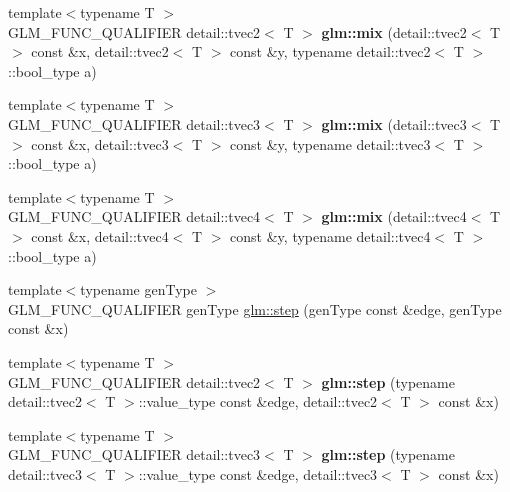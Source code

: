 \begin{DoxyCompactItemize}
\item 
\hypertarget{namespaceglm_a05ad08dcf9406a0f4fc653e91052cc7d}{}{\footnotesize template$<$typename T $>$ }\\G\+L\+M\+\_\+\+F\+U\+N\+C\+\_\+\+Q\+U\+A\+L\+I\+F\+I\+E\+R detail\+::tvec2$<$ T $>$ {\bfseries glm\+::mix} (detail\+::tvec2$<$ T $>$ const \&x, detail\+::tvec2$<$ T $>$ const \&y, typename detail\+::tvec2$<$ T $>$\+::bool\+\_\+type a)\label{namespaceglm_a05ad08dcf9406a0f4fc653e91052cc7d}

\item 
\hypertarget{namespaceglm_ae3f77298c77a5050ee511baee6d33044}{}{\footnotesize template$<$typename T $>$ }\\G\+L\+M\+\_\+\+F\+U\+N\+C\+\_\+\+Q\+U\+A\+L\+I\+F\+I\+E\+R detail\+::tvec3$<$ T $>$ {\bfseries glm\+::mix} (detail\+::tvec3$<$ T $>$ const \&x, detail\+::tvec3$<$ T $>$ const \&y, typename detail\+::tvec3$<$ T $>$\+::bool\+\_\+type a)\label{namespaceglm_ae3f77298c77a5050ee511baee6d33044}

\item 
\hypertarget{namespaceglm_ac37856ea533b4d5b40cf13fd1656f81a}{}{\footnotesize template$<$typename T $>$ }\\G\+L\+M\+\_\+\+F\+U\+N\+C\+\_\+\+Q\+U\+A\+L\+I\+F\+I\+E\+R detail\+::tvec4$<$ T $>$ {\bfseries glm\+::mix} (detail\+::tvec4$<$ T $>$ const \&x, detail\+::tvec4$<$ T $>$ const \&y, typename detail\+::tvec4$<$ T $>$\+::bool\+\_\+type a)\label{namespaceglm_ac37856ea533b4d5b40cf13fd1656f81a}

\item 
{\footnotesize template$<$typename gen\+Type $>$ }\\G\+L\+M\+\_\+\+F\+U\+N\+C\+\_\+\+Q\+U\+A\+L\+I\+F\+I\+E\+R gen\+Type \hyperlink{group__core__func__common_gaf21c84759af7799f573865f70c2f0a86}{glm\+::step} (gen\+Type const \&edge, gen\+Type const \&x)
\item 
\hypertarget{namespaceglm_ad31450d9914d789050de9d03963ff6dd}{}{\footnotesize template$<$typename T $>$ }\\G\+L\+M\+\_\+\+F\+U\+N\+C\+\_\+\+Q\+U\+A\+L\+I\+F\+I\+E\+R detail\+::tvec2$<$ T $>$ {\bfseries glm\+::step} (typename detail\+::tvec2$<$ T $>$\+::value\+\_\+type const \&edge, detail\+::tvec2$<$ T $>$ const \&x)\label{namespaceglm_ad31450d9914d789050de9d03963ff6dd}

\item 
\hypertarget{namespaceglm_abb223e75ad40dd1097f8b96162d128b4}{}{\footnotesize template$<$typename T $>$ }\\G\+L\+M\+\_\+\+F\+U\+N\+C\+\_\+\+Q\+U\+A\+L\+I\+F\+I\+E\+R detail\+::tvec3$<$ T $>$ {\bfseries glm\+::step} (typename detail\+::tvec3$<$ T $>$\+::value\+\_\+type const \&edge, detail\+::tvec3$<$ T $>$ const \&x)\label{namespaceglm_abb223e75ad40dd1097f8b96162d128b4}


\end{DoxyCompactItemize}
